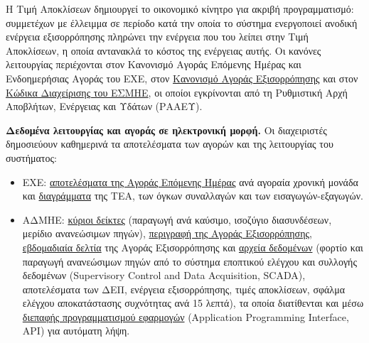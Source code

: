 Η Τιμή Αποκλίσεων δημιουργεί το οικονομικό κίνητρο για ακριβή προγραμματισμό: συμμετέχων με
έλλειμμα σε περίοδο κατά την οποία το σύστημα ενεργοποιεί ανοδική ενέργεια εξισορρόπησης
πληρώνει την ενέργεια που του λείπει στην Τιμή Αποκλίσεων, η οποία αντανακλά το κόστος της
ενέργειας αυτής. Οι κανόνες λειτουργίας περιέχονται στον
Κανονισμό Αγοράς Επόμενης Ημέρας και Ενδοημερήσιας Αγοράς του ΕΧΕ, στον
\href{https://www.admie.gr/agora/rythmistiko-plaisio-agoras/kanonismos-agoras-eksisorropisis}{Κανονισμό
Αγοράς Εξισορρόπησης} και στον
\href{https://www.admie.gr/agora/rythmistiko-plaisio-agoras/kodikas-diaxeirisis-esmie}{Κώδικα
Διαχείρισης του ΕΣΜΗΕ}, οι οποίοι εγκρίνονται από τη Ρυθμιστική Αρχή Αποβλήτων, Ενέργειας και
Υδάτων (ΡΑΑΕΥ).

\textbf{Δεδομένα λειτουργίας και αγοράς σε ηλεκτρονική μορφή.} Οι διαχειριστές δημοσιεύουν
καθημερινά τα αποτελέσματα των αγορών και της λειτουργίας του συστήματος:

\begin{itemize}
\item ΕΧΕ:
      \href{https://www.enexgroup.gr/el/web/guest/markets-publications-el-day-ahead-market}{αποτελέσματα
      της Αγοράς Επόμενης Ημέρας} ανά αγοραία χρονική μονάδα και
      \href{https://www.enexgroup.gr/el/web/guest/day-ahead-market-figures}{διαγράμματα} της ΤΕΑ,
      των όγκων συναλλαγών και των εισαγωγών-εξαγωγών.
\item ΑΔΜΗΕ:
      \href{https://www.admie.gr/agora/statistika-agoras/kyrioi-deiktes-dashboard/paragogi-ana-kaysimo-isozygio-diasyndeseon}{κύριοι
      δείκτες} (παραγωγή ανά καύσιμο, ισοζύγιο διασυνδέσεων, μερίδιο ανανεώσιμων πηγών),
      \href{https://www.admie.gr/agora/genika/agora-eksisorropisis}{περιγραφή της Αγοράς
      Εξισορρόπησης},
      \href{https://www.admie.gr/agora/enimerotika-deltia/ebdomadiaia-deltia-agoras-eksisorropisis}{εβδομαδιαία
      δελτία} της Αγοράς Εξισορρόπησης και
      \href{https://www.admie.gr/agora/statistika-agoras/dedomena}{αρχεία δεδομένων} (φορτίο και
      παραγωγή ανανεώσιμων πηγών από το σύστημα εποπτικού ελέγχου και συλλογής δεδομένων
      (Supervisory Control and Data Acquisition, SCADA), αποτελέσματα των ΔΕΠ, ενέργεια εξισορρόπησης,
      τιμές αποκλίσεων, σφάλμα ελέγχου αποκατάστασης συχνότητας ανά 15 λεπτά), τα οποία
      διατίθενται και μέσω
      \href{https://www.admie.gr/agora/statistika-agoras/file-download-api}{διεπαφής
      προγραμματισμού εφαρμογών} (Application Programming Interface, API) για αυτόματη λήψη.
\end{itemize}

